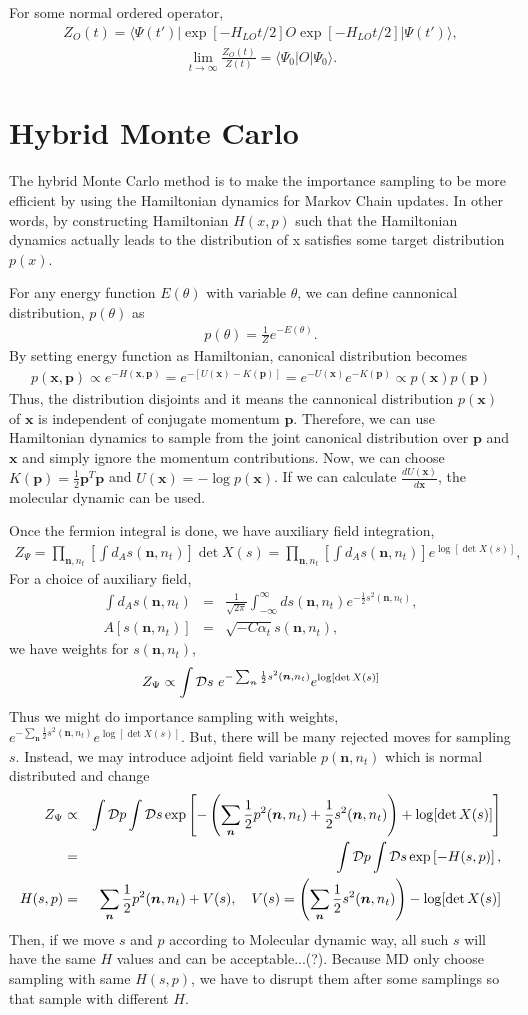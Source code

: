 \documentclass[10pt]{book}
\def\bm{\boldsymbol}
\newcommand{\bea}{\begin{eqnarray}}
\newcommand{\eea}{\end{eqnarray}}
\newcommand{\no}{\nonumber \\}
\def\vn{{\bm n}}
\def\vp{{\bm p}}
\def\vx{{\bm x}}
\def\la{\langle}
\def\ra{\rangle}
\begin{document}
For some normal ordered operator,
\bea 
Z_O(t)=\la \Psi(t')|\exp[-H_{LO} t/2] O \exp[-H_{LO} t/2]|\Psi(t')\ra, 
\eea 
\bea 
\lim_{t\to \infty}\frac{Z_O(t)}{Z(t)}=\la \Psi_0|O|\Psi_0\ra. 
\eea 


\section{Hybrid Monte Carlo}
The hybrid Monte Carlo method is to make the importance sampling to be 
more efficient by using the Hamiltonian dynamics for Markov Chain updates.
In other words, by constructing Hamiltonian $H(x,p)$ such that 
the Hamiltonian dynamics actually leads to the distribution of x 
satisfies some target distribution $p(x)$. 

For any energy function $E(\theta)$ with variable $\theta$,
we can define cannonical distribution, $p(\theta)$ as
\bea
p(\theta)=\frac{1}{Z} e^{-E(\theta)}.
\eea
By setting energy function as Hamiltonian, canonical distribution
becomes
\bea 
p(\vx,\vp)\propto e^{-H(\vx,\vp)}=e^{-[U(\vx)-K(\vp)]}
  = e^{-U(\vx)}e^{-K(\vp)} \propto p(\vx) p(\vp)
\eea 
Thus, the distribution disjoints and it means the cannonical 
distribution $p(\vx)$ of $\vx$
is independent of conjugate momentum $\vp$. 
Therefore, we can use Hamiltonian dynamics to sample 
from the joint canonical distribution over $\vp$ and $\vx$ 
and simply ignore the momentum contributions. Now, 
we can choose $K(\vp)=\frac{1}{2}\vp^{T}\vp$ and 
$U(\vx)=-\log p(\vx)$. If we can calculate $\frac{d U(\vx)}{d\vx}$, 
the molecular dynamic can be used. 

Once the fermion integral is done, we have auxiliary field integration,
\bea 
Z_{\Psi}=\prod_{\vn,n_t}[\int d_A s(\vn,n_t)]\det X(s)
        =\prod_{\vn,n_t}[\int d_A s(\vn,n_t)]e^{\log[\det X(s)]}    , 
\eea 
For a choice of auxiliary field,
\bea 
\int d_A s(\vn,n_t)
&=&\frac{1}{\sqrt{2\pi}}\int_{-\infty}^{\infty} ds(\vn,n_t) e^{-\frac{1}{2}s^2(\vn,n_t)},\no 
A[s(\vn,n_t)]&=&\sqrt{-C\alpha_t} s(\vn,n_t),
\eea 
we have weights for $s(\vn,n_t)$,
\bea 
Z_{\Psi}\propto\int {\cal D} s\ e^{-\sum_{\vn}\frac{1}{2}s^2(\vn,n_t)}e^{\log[\det X(s)]}  
\eea
Thus we might do importance sampling with weights, 
$e^{-\sum_{\vn}\frac{1}{2}s^2(\vn,n_t)}e^{\log[\det X(s)]}$. But, there will
be many rejected moves for sampling $s$. Instead, we may introduce adjoint 
field variable $p(\vn,n_t)$ which is normal distributed and change
\bea
Z_\Psi &\propto&  \int{\cal D}p \int {\cal D} s
    \exp\left[
    -\left(\sum_\vn \frac{1}{2}p^2(\vn,n_t)+\frac{1}{2}s^2(\vn,n_t)\right)
    +\log[\det X(s)]
    \right] \no 
    &=&\int{\cal D}p \int {\cal D} s
    \exp\left[-H(s,p)
    \right], \no 
H(s,p)&=&\sum_{\vn}\frac{1}{2} p^2(\vn,n_t)+V(s),\quad
V(s)=\left( \sum_{\vn}\frac{1}{2} s^2(\vn,n_t) \right)-\log[\det X(s)] \no
\eea
Then, if we move $s$ and $p$ according to Molecular dynamic way,
all such $s$ will have the same $H$ values and can be acceptable...(?).
Because MD only choose sampling with same $H(s,p)$, we have to
disrupt them after some samplings so that sample with different $H$.  
 
\end{document}
